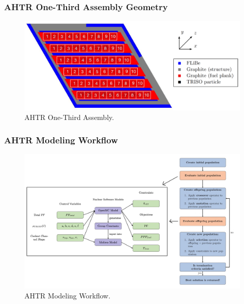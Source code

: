 \begin{frame}
    \frametitle{AHTR One-Third Assembly Geometry}
    \begin{figure}
        \includegraphics[width=\linewidth]{figures/ahtr-assembly-pres.png} 
        \caption{AHTR One-Third Assembly.}
    \end{figure}
\end{frame}

\begin{frame}
    \frametitle{AHTR Modeling Workflow}
    \begin{figure}
        \includegraphics[width=0.95\linewidth]{figures/ahtr-modeling-workflow.png} 
        \caption{AHTR Modeling Workflow.}
    \end{figure}
\end{frame}

